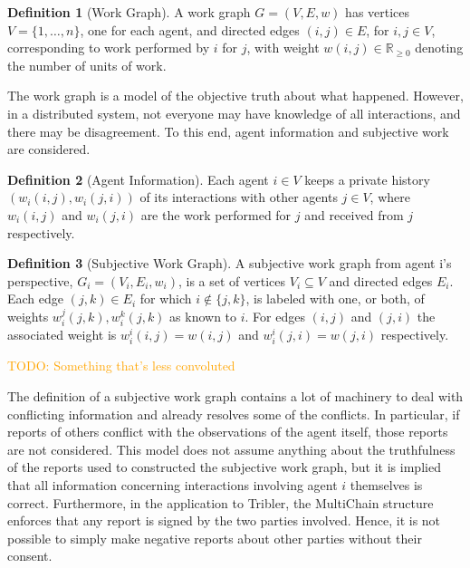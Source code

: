 \documentclass[a4paper,11pt]{book}
\newcommand{\bb}{\mathbb}
\newcommand\nicetohave[1]{\textcolor{orange}{TODO: #1}}
\theoremstyle{definition}
\newtheorem{definition}{Definition}
\begin{document}
\begin{definition}[Work Graph]
    A work graph $G = (V, E, w)$ has vertices $V = \{1, \ldots, n\}$, one for each agent, and directed
    edges $(i, j) \in E$, for $i, j \in V$, corresponding to work performed by $i$ for $j$, with weight
    $w(i,j) \in \bb{R}_{\geq0}$ denoting the number of units of work.
    \label{def:work_graph}
\end{definition}

The work graph is a model of the objective truth about what happened. However, in a distributed system,
not everyone may have knowledge of all interactions, and there may be disagreement. To this end, agent
information and subjective work are considered.

\begin{definition}[Agent Information]
   Each agent $i \in V$ keeps a private history $(w_i(i,j), w_i(j, i))$ of its interactions with
   other agents $j \in V$, where $w_i(i,j)$ and $w_i(j,i)$ are the work performed for $j$ and
   received from $j$ respectively.
\end{definition}

\begin{definition}[Subjective Work Graph]
   A subjective work graph from agent i's perspective, $G_i = (V_i, E_i, w_i)$, is a set of vertices
   $V_i \subseteq V$ and directed edges $E_i$. Each edge $(j, k) \in E_i$ for which $i \notin \{j, k\}$,
   is labeled with one, or both, of weights $w^j_i(j, k), w_i^k(j, k)$ as known to $i$. For edges $(i,j)$
   and $(j,i)$ the associated weight is $w_i^i(i,j) = w(i,j)$ and $w_i^i(j, i) = w(j,i)$ respectively.
\end{definition}

\nicetohave{Something that's less convoluted}

The definition of a subjective work graph contains a lot of machinery to deal with conflicting information
and already resolves some of the conflicts. In particular, if reports of others conflict with the observations
of the agent itself, those reports are not considered. This model does not assume anything about the truthfulness
of the reports used to constructed the subjective work graph, but it is implied that all information concerning
interactions involving agent $i$ themselves is correct. Furthermore, in the application to Tribler, the
MultiChain structure enforces that any report is signed by the two parties involved. Hence, it is not possible
to simply make negative reports about other parties without their consent. 
\end{document}
